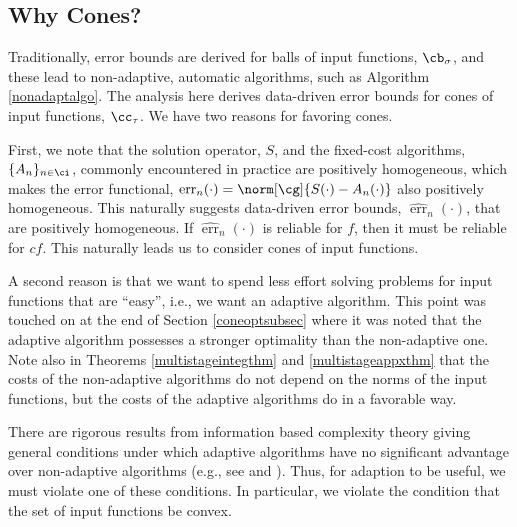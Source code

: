 \documentclass[]{elsarticle}
\DeclareMathOperator{\err}{err}
\newcommand{\herr}{\widehat{\err}}
\theoremstyle{definition}
\theoremstyle{remark}
\newcommand{\Gnorm}[1]{\norm[\cg]{#1}}
\begin{document}
\subsection{Why Cones?}

Traditionally, error bounds are derived for balls of input functions, $\cb_{\sigma}$, and these lead to non-adaptive, automatic algorithms, such as Algorithm \ref{nonadaptalgo}. The analysis here derives data-driven error bounds for cones of input functions, $\cc_{\tau}$.  We have two reasons for favoring cones.  

First, we note that the solution operator, $S$, and the fixed-cost algorithms, $\{A_n\}_{n\in \ci}$, commonly encountered in practice are positively homogeneous, which makes the error functional, $\err_n(\cdot) = \Gnorm{S(\cdot)-A_n(\cdot)}$ also positively homogeneous.  This naturally suggests data-driven error bounds, $\herr_n(\cdot)$, that are positively homogeneous.  If $\herr_n(\cdot)$ is reliable for $f$, then it must be reliable for $cf$. This naturally leads us to consider cones of input functions.

A second reason is that we want to spend less effort solving problems for input functions that are ``easy'', i.e., we want an adaptive algorithm.  This point was touched on at the end of Section \ref{coneoptsubsec} where it was noted that the adaptive algorithm possesses a stronger optimality than the non-adaptive one.  Note also in Theorems \ref{multistageintegthm} and \ref{multistageappxthm} that the costs of the non-adaptive algorithms do not depend on the norms of the input functions, but the costs of the adaptive algorithms do in a favorable way.

There are rigorous results from information based complexity theory giving general conditions under which adaptive algorithms have no significant advantage over non-adaptive algorithms (e.g., see \cite[Chapter 4, Theorem 5.2.1]{TraWasWoz88} and \cite{Nov96a}). Thus, for adaption to be useful, we must violate one of these conditions.  In particular, we violate the condition that the set of input functions be convex.
\end{document}
